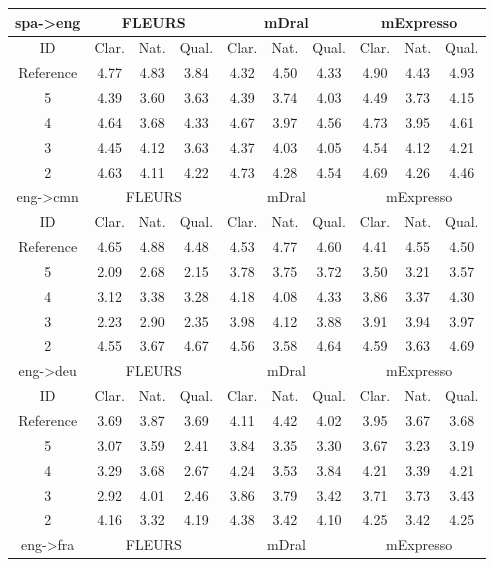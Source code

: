 \begin{table}[!ht]
\begin{tabular}{c|ccc|ccc|ccc}
\hline
spa->eng & \multicolumn{3}{c|}{FLEURS} & \multicolumn{3}{c|}{mDral} & \multicolumn{3}{c|}{mExpresso}\\
\hline
ID & Clar. & Nat. & Qual. & Clar. & Nat. & Qual. & Clar. & Nat. & Qual. \\
\hline
Reference & 4.77 & 4.83 & 3.84 & 4.32 & 4.50 & 4.33 & 4.90 & 4.43 & 4.93\\
5 & 4.39 & 3.60 & 3.63 & 4.39 & 3.74 & 4.03 & 4.49 & 3.73 & 4.15\\
4 & 4.64 & 3.68 & 4.33 & 4.67 & 3.97 & 4.56 & 4.73 & 3.95 & 4.61\\
3 & 4.45 & 4.12 & 3.63 & 4.37 & 4.03 & 4.05 & 4.54 & 4.12 & 4.21\\
2 & 4.63 & 4.11 & 4.22 & 4.73 & 4.28 & 4.54 & 4.69 & 4.26 & 4.46\\
\hline
eng->cmn & \multicolumn{3}{c|}{FLEURS} & \multicolumn{3}{c|}{mDral} & \multicolumn{3}{c|}{mExpresso}\\
\hline
ID & Clar. & Nat. & Qual. & Clar. & Nat. & Qual. & Clar. & Nat. & Qual. \\
\hline
Reference & 4.65 & 4.88 & 4.48 & 4.53 & 4.77 & 4.60 & 4.41 & 4.55 & 4.50\\
5 & 2.09 & 2.68 & 2.15 & 3.78 & 3.75 & 3.72 & 3.50 & 3.21 & 3.57\\
4 & 3.12 & 3.38 & 3.28 & 4.18 & 4.08 & 4.33 & 3.86 & 3.37 & 4.30\\
3 & 2.23 & 2.90 & 2.35 & 3.98 & 4.12 & 3.88 & 3.91 & 3.94 & 3.97\\
2 & 4.55 & 3.67 & 4.67 & 4.56 & 3.58 & 4.64 & 4.59 & 3.63 & 4.69\\
\hline
eng->deu & \multicolumn{3}{c|}{FLEURS} & \multicolumn{3}{c|}{mDral} & \multicolumn{3}{c|}{mExpresso}\\
\hline
ID & Clar. & Nat. & Qual. & Clar. & Nat. & Qual. & Clar. & Nat. & Qual. \\
\hline
Reference & 3.69 & 3.87 & 3.69 & 4.11 & 4.42 & 4.02 & 3.95 & 3.67 & 3.68\\
5 & 3.07 & 3.59 & 2.41 & 3.84 & 3.35 & 3.30 & 3.67 & 3.23 & 3.19\\
4 & 3.29 & 3.68 & 2.67 & 4.24 & 3.53 & 3.84 & 4.21 & 3.39 & 4.21\\
3 & 2.92 & 4.01 & 2.46 & 3.86 & 3.79 & 3.42 & 3.71 & 3.73 & 3.43\\
2 & 4.16 & 3.32 & 4.19 & 4.38 & 3.42 & 4.10 & 4.25 & 3.42 & 4.25\\
\hline
eng->fra & \multicolumn{3}{c|}{FLEURS} & \multicolumn{3}{c|}{mDral} & \multicolumn{3}{c|}{mExpresso}\\

\end{tabular}
\end{table}
